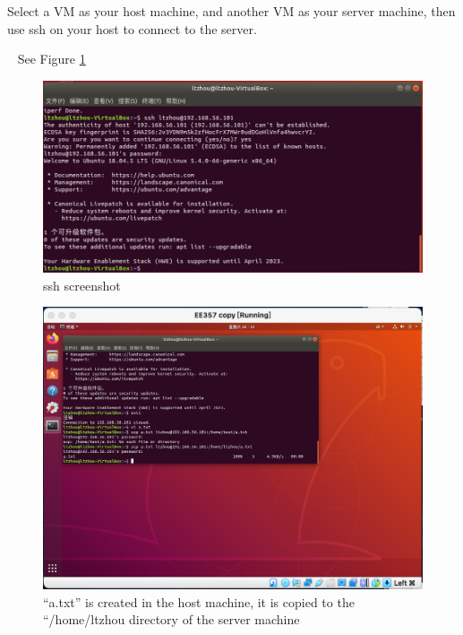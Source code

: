 \begin{exercise}[]{Select a VM as your host machine, and another VM as your server machine, then use ssh on your host to connect to the server.}
  \begin{solution}
  \par{~} See Figure \ref{fig:ex5}
  \begin{figure}[hb]
    \begin{center}
    \includegraphics[width=12cm]{img/lab1/ex5}
    \caption{ssh screenshot}
    \label{fig:ex5}
    \end{center}
  \end{figure}
  \end{solution}
  \label{ex5}
\end{exercise}



\begin{figure}[hb]
  \begin{center}
  \includegraphics[width=12cm]{img/lab1/ex6-2}
  \caption{“a.txt” is created in the host machine, it is copied to the “/home/ltzhou directory of the server machine}
  \label{fig:ex61}
  \end{center}
\end{figure}

